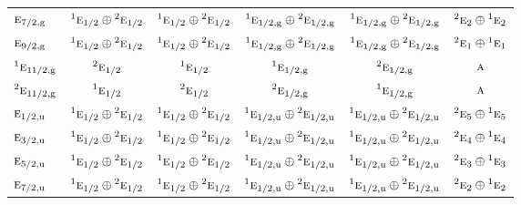 \documentclass[10pt,a4paper]{article}
\numberwithin{equation}{section}
\newcommand{\irr}[1]{\text{\normalfont\scshape #1}}
\newcommand{\conjpair}[1]{{}^{#1}}
\newcommand{\ptag}[1]{\mathrm{#1}}
\begin{document}
{\begin{longtable}{@{}lccccc@{}}
$\irr{e}_{7/2,\ptag{g}}$ & $\conjpair{1}\irr{e}_{1/2}\oplus \conjpair{2}\irr{e}_{1/2}$ & $\conjpair{1}\irr{e}_{1/2}\oplus \conjpair{2}\irr{e}_{1/2}$ & $\conjpair{1}\irr{e}_{1/2,\ptag{g}}\oplus \conjpair{2}\irr{e}_{1/2,\ptag{g}}$ & $\conjpair{1}\irr{e}_{1/2,\ptag{g}}\oplus \conjpair{2}\irr{e}_{1/2,\ptag{g}}$ & $\conjpair{2}\irr{e}_{2}\oplus \conjpair{1}\irr{e}_{2}$\\
$\irr{e}_{9/2,\ptag{g}}$ & $\conjpair{1}\irr{e}_{1/2}\oplus \conjpair{2}\irr{e}_{1/2}$ & $\conjpair{1}\irr{e}_{1/2}\oplus \conjpair{2}\irr{e}_{1/2}$ & $\conjpair{1}\irr{e}_{1/2,\ptag{g}}\oplus \conjpair{2}\irr{e}_{1/2,\ptag{g}}$ & $\conjpair{1}\irr{e}_{1/2,\ptag{g}}\oplus \conjpair{2}\irr{e}_{1/2,\ptag{g}}$ & $\conjpair{2}\irr{e}_{1}\oplus \conjpair{1}\irr{e}_{1}$\\
$\conjpair{1}\irr{e}_{11/2,\ptag{g}}$ & $\conjpair{2}\irr{e}_{1/2}$ & $\conjpair{1}\irr{e}_{1/2}$ & $\conjpair{1}\irr{e}_{1/2,\ptag{g}}$ & $\conjpair{2}\irr{e}_{1/2,\ptag{g}}$ & $\irr{a}$\\
$\conjpair{2}\irr{e}_{11/2,\ptag{g}}$ & $\conjpair{1}\irr{e}_{1/2}$ & $\conjpair{2}\irr{e}_{1/2}$ & $\conjpair{2}\irr{e}_{1/2,\ptag{g}}$ & $\conjpair{1}\irr{e}_{1/2,\ptag{g}}$ & $\irr{a}$\\
$\irr{e}_{1/2,\ptag{u}}$ & $\conjpair{1}\irr{e}_{1/2}\oplus \conjpair{2}\irr{e}_{1/2}$ & $\conjpair{1}\irr{e}_{1/2}\oplus \conjpair{2}\irr{e}_{1/2}$ & $\conjpair{1}\irr{e}_{1/2,\ptag{u}}\oplus \conjpair{2}\irr{e}_{1/2,\ptag{u}}$ & $\conjpair{1}\irr{e}_{1/2,\ptag{u}}\oplus \conjpair{2}\irr{e}_{1/2,\ptag{u}}$ & $\conjpair{2}\irr{e}_{5}\oplus \conjpair{1}\irr{e}_{5}$\\
$\irr{e}_{3/2,\ptag{u}}$ & $\conjpair{1}\irr{e}_{1/2}\oplus \conjpair{2}\irr{e}_{1/2}$ & $\conjpair{1}\irr{e}_{1/2}\oplus \conjpair{2}\irr{e}_{1/2}$ & $\conjpair{1}\irr{e}_{1/2,\ptag{u}}\oplus \conjpair{2}\irr{e}_{1/2,\ptag{u}}$ & $\conjpair{1}\irr{e}_{1/2,\ptag{u}}\oplus \conjpair{2}\irr{e}_{1/2,\ptag{u}}$ & $\conjpair{2}\irr{e}_{4}\oplus \conjpair{1}\irr{e}_{4}$\\
$\irr{e}_{5/2,\ptag{u}}$ & $\conjpair{1}\irr{e}_{1/2}\oplus \conjpair{2}\irr{e}_{1/2}$ & $\conjpair{1}\irr{e}_{1/2}\oplus \conjpair{2}\irr{e}_{1/2}$ & $\conjpair{1}\irr{e}_{1/2,\ptag{u}}\oplus \conjpair{2}\irr{e}_{1/2,\ptag{u}}$ & $\conjpair{1}\irr{e}_{1/2,\ptag{u}}\oplus \conjpair{2}\irr{e}_{1/2,\ptag{u}}$ & $\conjpair{2}\irr{e}_{3}\oplus \conjpair{1}\irr{e}_{3}$\\
$\irr{e}_{7/2,\ptag{u}}$ & $\conjpair{1}\irr{e}_{1/2}\oplus \conjpair{2}\irr{e}_{1/2}$ & $\conjpair{1}\irr{e}_{1/2}\oplus \conjpair{2}\irr{e}_{1/2}$ & $\conjpair{1}\irr{e}_{1/2,\ptag{u}}\oplus \conjpair{2}\irr{e}_{1/2,\ptag{u}}$ & $\conjpair{1}\irr{e}_{1/2,\ptag{u}}\oplus \conjpair{2}\irr{e}_{1/2,\ptag{u}}$ & $\conjpair{2}\irr{e}_{2}\oplus \conjpair{1}\irr{e}_{2}$\\

\end{longtable}}
\end{document}
